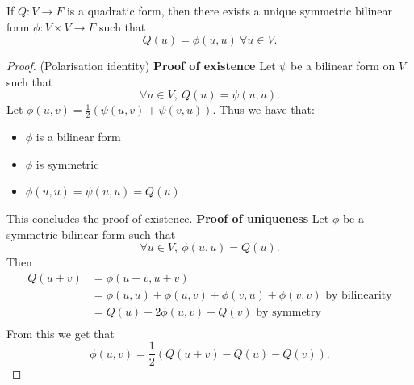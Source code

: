 \documentclass[a4paper]{scrartcl}
\begin{document}
\begin{proposition}
     If $Q: V \rightarrow F$ is a quadratic form, then there exists a unique symmetric bilinear form $\phi: V \times V \rightarrow F $ such that 
     \[Q(u)=\phi (u,u) \ \forall u \in V.\]
\end{proposition}
\begin{proof}(Polarisation identity)\newline 
     \textbf{Proof of existence}\newline 
     Let $\psi$ be a bilinear form on $V$ such that 
     \[\forall u \in V, \ Q(u)=\psi (u,u).\]
     Let $\phi (u,v)=\frac{1}{2} (\psi (u,v)+ \psi (v,u))$. Thus we have that:
     \begin{itemize}
         \item $\phi$ is a bilinear form
         \item $\phi$ is symmetric
         \item $\phi (u,u)=\psi (u,u)=Q (u)$.
     \end{itemize}
     This concludes the proof of existence.\newline 
     \textbf{Proof of uniqueness}\newline 
     Let $\phi$ be a symmetric bilinear form such that 
     \[\forall u \in V, \ \phi (u,u)=Q(u).\]
     Then 
     \begin{equation*}
          \begin{split}
            Q (u+v)&=\phi (u+v,u+v)\\
            &=\phi (u,u)+ \phi (u,v)+\phi (v,u)+ \phi (v,v) \text{ by bilinearity} \\
            &=Q(u)+ 2\phi (u,v)+Q(v) \text{ by symmetry}\\
          \end{split}
     \end{equation*}
     From this we get that 
     \[\phi(u,v)=\frac{1}{2} (Q (u+v)-Q (u)- Q (v)).\]
\end{proof}
\end{document}
